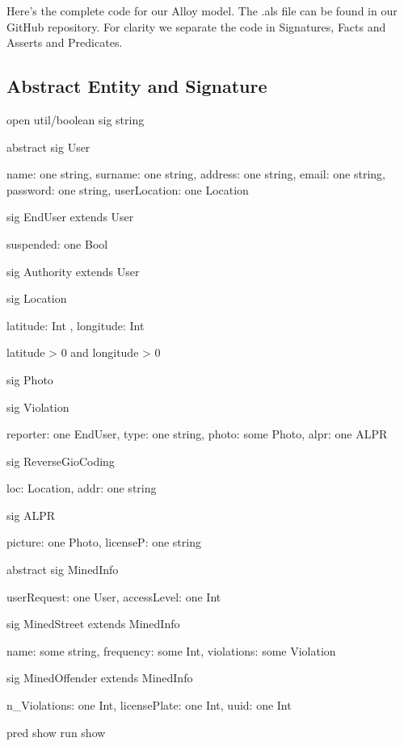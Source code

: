 Here’s the complete code for our Alloy model. The .als file can be found in our
GitHub repository. For clarity we separate the code in Signatures, Facts and
Asserts and Predicates.

\subsection{Abstract Entity and Signature}

open util/boolean
sig string {}


abstract sig User {

  name: one string,
  surname:  one string,
  address: one string,
  email: one string,
  password: one string,
  userLocation: one Location 

}

sig EndUser extends User{

  suspended: one Bool

}

sig Authority extends User{}

sig Location {

  latitude: Int ,
  longitude: Int

  }{

  latitude > 0 and longitude > 0

}

sig Photo {}

sig Violation {
  
  
  reporter: one EndUser,
  type: one string,
  photo: some Photo,
  alpr: one ALPR

}

sig ReverseGioCoding {

  loc: Location,
  addr: one string

}

sig ALPR {

  picture: one Photo,
  licenseP: one string

}

abstract sig MinedInfo {

  userRequest: one User,
  accessLevel: one Int  

}

sig MinedStreet extends MinedInfo{

  name: some string,
  frequency: some Int,
  violations: some Violation

}


sig MinedOffender extends MinedInfo{
  
  n_Violations: one Int,
  licensePlate: one Int,
  uuid: one Int

}

pred show {}
run show
